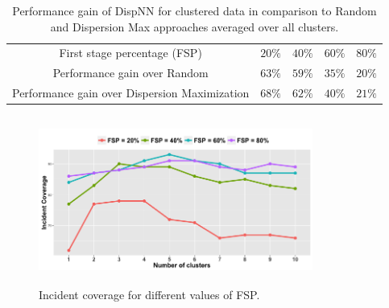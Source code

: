 \documentclass{acm_proc_article-sp}
\begin{document}
\begin{table}[!tb]
\centering
\begin{tabulary}{0.5\textwidth}{|C|C|C|C|C|}
\hline
First stage percentage (FSP) & $20\%$ & $40\%$  & $60\%$  & $80\%$  \\ \Xhline{3\arrayrulewidth}
Performance gain over Random   & $63\%$ & $59\%$  & $35\%$  & $20\%$  \\ \hline
Performance gain over Dispersion Maximization   & $68\%$ & $62\%$  & $40\%$  & $21\%$ \\ \hline
\end{tabulary}
\caption{Performance gain of DispNN for clustered data in comparison to Random and Dispersion Max approaches averaged over all clusters.}
\label{table:clusteredSurge}
\end{table}


\begin{figure}[!tb]
\centering
\includegraphics[width=9cm ,height=5.5cm]{figuresPng/Coverage_Result.png}
\caption{Incident coverage for different values of FSP. }
\label{fig: clustCoverage}
\end{figure}
\end{document}
